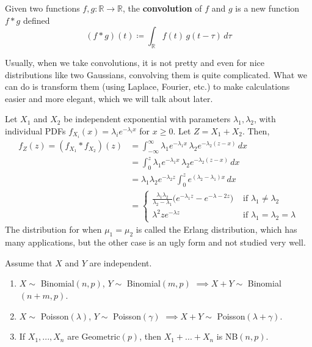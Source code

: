     \begin{definition}[Convolution]
      Given two functions $f, g: \mathbb{R} \longrightarrow \mathbb{R}$, the \textbf{convolution} of $f$ and $g$ is a new function $f \ast g$ defined  
      \begin{equation}
        (f \ast g) (t) \coloneqq \int_\mathbb{R} f(t)\, g(t - \tau) \, d \tau
      \end{equation}
    \end{definition}

    Usually, when we take convolutions, it is not pretty and even for nice distributions like two Gaussians, convolving them is quite complicated. What we can do is transform them (using Laplace, Fourier, etc.) to make calculations easier and more elegant, which we will talk about later.  

    \begin{example}
      Let $X_1$ and $X_2$ be independent exponential with parameters $\lambda_1, \lambda_2$, with individual PDFs $f_{X_i} (x) = \lambda_i e^{-\lambda_i x}$ for $x \geq 0$. Let $Z = X_1 + X_2$. Then, 
      \begin{align*}
        f_Z (z) = (f_{X_1} \ast f_{X_2})(z) & = \int_{-\infty}^\infty \lambda_1 e^{-\lambda_1 x} \, \lambda_2 e^{-\lambda_2 (z -x)} \, dx \\
        & = \int_{0}^z \lambda_1 e^{-\lambda_1 x} \, \lambda_2 e^{-\lambda_2 (z -x)} \, dx \\ 
        & = \lambda_1 \lambda_2 e^{-\lambda_2 z} \int_0^z e^{(\lambda_2 - \lambda_1) x}\,dx \\
        & = \begin{cases} \frac{\lambda_1 \lambda_2}{\lambda_2 - \lambda_1} \big( e^{-\lambda_1 z} - e^{-\lambda-2 z} \big) & \text{ if } \lambda_1 \neq \lambda_2 \\
        \lambda^2 z e^{-\lambda z} & \text{ if } \lambda_1 = \lambda_2 = \lambda \end{cases} 
      \end{align*}
      The distribution for when $\mu_1 = \mu_2$ is called the Erlang distribution, which has many applications, but the other case is an ugly form and not studied very well. 
    \end{example}

    \begin{theorem}
      Assume that $X$ and $Y$ are independent. 
      \begin{enumerate}
        \item $X \sim$ Binomial$(n, p)$, $Y \sim$ Binomial$(m, p)$ $\implies X + Y \sim$ Binomial$(n + m, p)$. 
        \item $X \sim$ Poisson$(\lambda)$, $Y \sim$ Poisson$(\gamma)$ $\implies X + Y \sim$ Poisson$(\lambda + \gamma)$. 
        \item If $X_1, ..., X_n$ are Geometric$(p)$, then $X_1 + ... + X_n$ is NB$(n, p)$. 
      \end{enumerate}
    \end{theorem}

